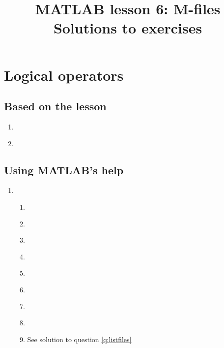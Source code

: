 \documentclass{article}
\title{MATLAB lesson 6: M-files\\Solutions to exercises}
\date{}
\author{} %
\begin{document}
	\maketitle
	
	\section{Logical operators}
	\subsection*{Based on the lesson}
		\begin{enumerate}
			\item \ 
			
			\item \ 

		\end{enumerate}
	\subsection*{Using MATLAB's help}
	\begin{enumerate}[resume]
		\item 
		\begin{enumerate} 
			\item \ 
			
			\item \ 
			
			\item \ 
			
			\item \ 
			
			
			
			\item \ 
			
			\item \ 
			
			\item \ 
			
			\item \ 
			\label{q:listfiles}
			
			\item See solution to question \ref{q:listfiles}
		\end{enumerate}
	\end{enumerate}
\end{document}
